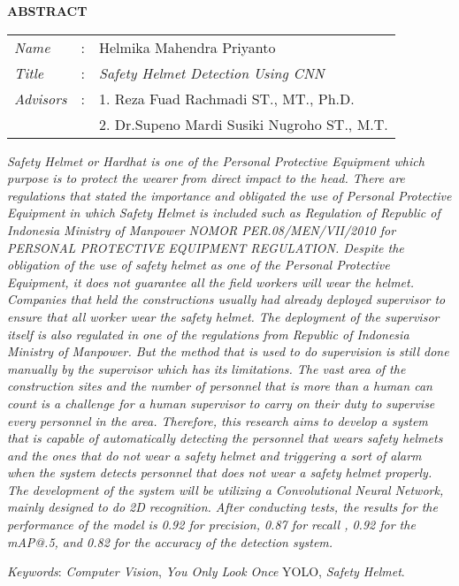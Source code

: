 \begin{center}
  \large\textbf{ABSTRACT}
\end{center}


\vspace{2ex}

\begingroup
  \setlength{\tabcolsep}{0pt}

  \noindent
  \begin{tabularx}{\textwidth}{l >{\centering}m{3em} X}
    \emph{Name}     &:& Helmika Mahendra Priyanto \\

    \emph{Title}    &:& \emph{Safety Helmet Detection Using CNN} \\

    \emph{Advisors} &:& 1. Reza Fuad Rachmadi ST., MT., Ph.D. \\
                    & & 2. Dr.Supeno Mardi Susiki Nugroho ST., M.T. \\
  \end{tabularx}
\endgroup

\par \emph{
  Safety Helmet or Hardhat is one of the Personal Protective Equipment which purpose is to protect the wearer from direct impact to the head. There are regulations that stated the importance and obligated the use of Personal Protective Equipment in which Safety Helmet is included such as Regulation of Republic of Indonesia Ministry of Manpower \emph{NOMOR PER.08/MEN/VII/2010} for PERSONAL PROTECTIVE EQUIPMENT REGULATION. Despite the obligation of the use of safety helmet as one of the Personal Protective Equipment, it does not guarantee all the field workers will wear the helmet. Companies that held the constructions usually had already deployed supervisor to ensure that all worker wear the safety helmet. The deployment of the supervisor itself is also regulated in one of the regulations from Republic of Indonesia Ministry of Manpower. But the method that is used to do supervision is still done manually by the supervisor which has its limitations. The vast area of the construction sites and the number of personnel that is more than a human can count is a challenge for a human supervisor to carry on their duty to supervise every personnel in the area. Therefore, this research aims to develop a system that is capable of automatically detecting the personnel that wears safety helmets and the ones that do not wear a safety helmet and triggering a sort of alarm when the system detects personnel that does not wear a safety helmet properly. The development of the system will be utilizing a Convolutional Neural Network, mainly designed to do 2D recognition. After conducting tests, the results for the performance of the model is 0.92 for precision, 0.87 for recall , 0.92 for the mAP@.5, and 0.82 for the accuracy of the detection system. 
}


\emph{Keywords}: \emph{Computer Vision}, \emph{You Only Look Once} YOLO, \emph{Safety Helmet}.
